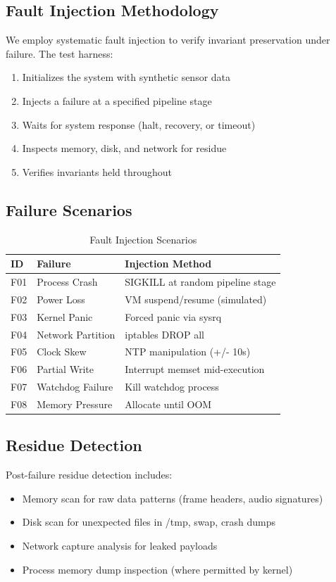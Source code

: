 \documentclass[conference]{IEEEtran}
\begin{document}
\subsection{Fault Injection Methodology}
We employ systematic fault injection to verify invariant preservation under failure. The test harness:
\begin{enumerate}
    \item Initializes the system with synthetic sensor data
    \item Injects a failure at a specified pipeline stage
    \item Waits for system response (halt, recovery, or timeout)
    \item Inspects memory, disk, and network for residue
    \item Verifies invariants held throughout
\end{enumerate}

\subsection{Failure Scenarios}

\begin{table}[h]
\caption{Fault Injection Scenarios}
\centering
\begin{tabular}{p{1cm} p{2cm} p{4cm}}
\toprule
\textbf{ID} & \textbf{Failure} & \textbf{Injection Method} \\
\midrule
F01 & Process Crash & SIGKILL at random pipeline stage \\
F02 & Power Loss & VM suspend/resume (simulated) \\
F03 & Kernel Panic & Forced panic via sysrq \\
F04 & Network Partition & iptables DROP all \\
F05 & Clock Skew & NTP manipulation (+/- 10s) \\
F06 & Partial Write & Interrupt memset mid-execution \\
F07 & Watchdog Failure & Kill watchdog process \\
F08 & Memory Pressure & Allocate until OOM \\
\bottomrule
\end{tabular}
\label{tab:injection}
\end{table}

\subsection{Residue Detection}
Post-failure residue detection includes:
\begin{itemize}
    \item Memory scan for raw data patterns (frame headers, audio signatures)
    \item Disk scan for unexpected files in /tmp, swap, crash dumps
    \item Network capture analysis for leaked payloads
    \item Process memory dump inspection (where permitted by kernel)
\end{itemize}
\end{document}
